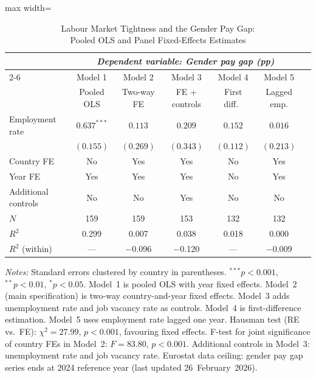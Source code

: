 \documentclass[12pt,a4paper]{article}
\begin{document}
\begin{table}[htbp]
\caption{Labour Market Tightness and the Gender Pay Gap:\\
         Pooled OLS and Panel Fixed-Effects Estimates}
\label{tab:regressions}
\begin{threeparttable}
\begin{adjustbox}{max width=\textwidth}
\begin{tabular}{lcccccc}
\toprule
 & \multicolumn{5}{c}{\textit{Dependent variable: Gender pay gap (pp)}} \\
\cmidrule(l){2-6}
 & Model 1 & Model 2 & Model 3 & Model 4 & Model 5 \\
 & Pooled OLS & Two-way FE & FE + controls & First diff.\ & Lagged emp. \\
\midrule
Employment rate & $0.637^{***}$ & $0.113$ & $0.209$ & $0.152$ & $0.016$ \\
                & $(0.155)$     & $(0.269)$ & $(0.343)$ & $(0.112)$ & $(0.213)$ \\[4pt]
Country FE      & No  & Yes & Yes & No  & Yes \\
Year FE         & Yes & Yes & Yes & No  & Yes \\
Additional controls & No & No & Yes & No & No \\
\midrule
$N$               & 159 & 159 & 153 & 132 & 132 \\
$R^{2}$           & 0.299 & 0.007 & 0.038 & 0.018 & 0.000 \\
$R^{2}$ (within)  & ---  & $-$0.096 & $-$0.120 & --- & $-$0.009 \\
\bottomrule
\end{tabular}
\end{adjustbox}
\begin{tablenotes}
\footnotesize
\item \textit{Notes:} Standard errors clustered by country in parentheses.
  $^{***}p<0.001$, $^{**}p<0.01$, $^{*}p<0.05$.
  Model~1 is pooled OLS with year fixed effects.
  Model~2 (main specification) is two-way country-and-year fixed effects.
  Model~3 adds unemployment rate and job vacancy rate as controls.
  Model~4 is first-difference estimation.
  Model~5 uses employment rate lagged one year.
  Hausman test (RE vs.\ FE): $\chi^{2}=27.99$, $p<0.001$, favouring fixed effects.
  F-test for joint significance of country FEs in Model~2: $F=83.80$, $p<0.001$.
  Additional controls in Model~3: unemployment rate and job vacancy rate.
  Eurostat data ceiling: gender pay gap series ends at 2024 reference year
  (last updated 26~February~2026).
\end{tablenotes}
\end{threeparttable}
\end{table}
\end{document}

